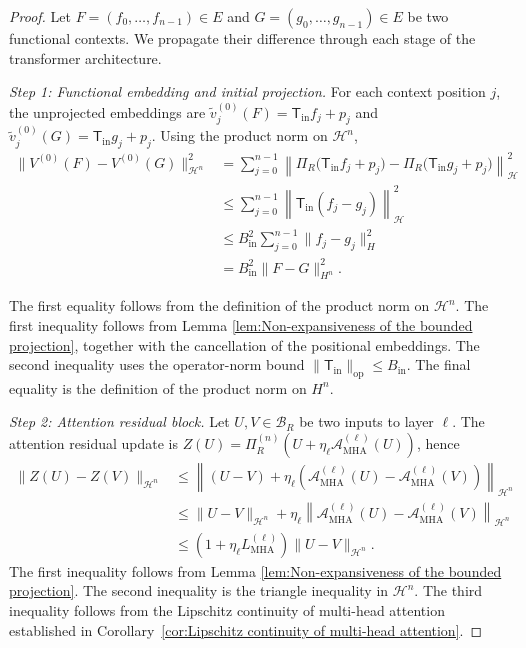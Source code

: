 \begin{proof}
Let \(F=(f_0,\ldots,f_{n-1})\in E\) and \(G=(g_0,\ldots,g_{n-1}) \in E\) be two functional contexts. We propagate their difference through each stage of the transformer architecture.

\textit{Step 1: Functional embedding and initial projection.} For each context position \(j\), the unprojected embeddings are \(\widetilde v_j^{(0)}(F)=\mathsf T_{\mathrm{in}}f_j+p_j\) and \(\widetilde v_j^{(0)}(G)=\mathsf T_{\mathrm{in}}g_j+p_j\). Using the product norm on \(\mathcal H^n\),
\[
\begin{aligned}
\|V^{(0)}(F)-V^{(0)}(G)\|_{\mathcal H^n}^2
&=
\sum_{j=0}^{n-1}
\left\|
\Pi_R\bigl(\mathsf T_{\mathrm{in}}f_j+p_j\bigr)
-
\Pi_R\bigl(\mathsf T_{\mathrm{in}}g_j+p_j\bigr)
\right\|_{\mathcal H}^2\\
&\leqslant
\sum_{j=0}^{n-1}
\left\|
\mathsf T_{\mathrm{in}}(f_j-g_j)
\right\|_{\mathcal H}^2\\
&\leqslant
B_{\mathrm{in}}^2
\sum_{j=0}^{n-1}
\|f_j-g_j\|_H^2\\
&=
B_{\mathrm{in}}^2
\|F-G\|_{H^n}^2.
\end{aligned}
\]

The first equality follows from the definition of the product norm on \(\mathcal H^n\). The first inequality follows from Lemma \ref{lem:Non-expansiveness of the bounded projection}, together with the cancellation of the positional embeddings. The second inequality uses the operator-norm bound \(\|\mathsf T_{\mathrm{in}}\|_{\mathrm{op}}\leqslant B_{\mathrm{in}}\). The final equality is the definition of the product norm on \(H^n\).

\textit{Step 2: Attention residual block.} Let \(U,V\in\mathcal B_R\) be two inputs to layer \(\ell\). The attention residual update is \(Z(U)=\Pi_R^{(n)}\left(U+\eta_\ell\mathcal A_{\mathrm{MHA}}^{(\ell)}(U)\right)\), hence
\[
\begin{aligned}
\|Z(U)-Z(V)\|_{\mathcal H^n}
&\leqslant
\left\|
(U-V)
+
\eta_\ell
\left(
\mathcal A_{\mathrm{MHA}}^{(\ell)}(U)
-
\mathcal A_{\mathrm{MHA}}^{(\ell)}(V)
\right)
\right\|_{\mathcal H^n}\\
&\leqslant
\|U-V\|_{\mathcal H^n}
+
\eta_\ell
\left\|
\mathcal A_{\mathrm{MHA}}^{(\ell)}(U)
-
\mathcal A_{\mathrm{MHA}}^{(\ell)}(V)
\right\|_{\mathcal H^n}\\
&\leqslant
\left(
1+\eta_\ell L_{\mathrm{MHA}}^{(\ell)}
\right)
\|U-V\|_{\mathcal H^n}.
\end{aligned}
\]
The first inequality follows from Lemma \ref{lem:Non-expansiveness of the bounded projection}. The second inequality is the triangle inequality in \(\mathcal H^n\). The third inequality follows from the Lipschitz continuity of multi-head attention established in Corollary~\ref{cor:Lipschitz continuity of multi-head attention}.


\end{proof}
